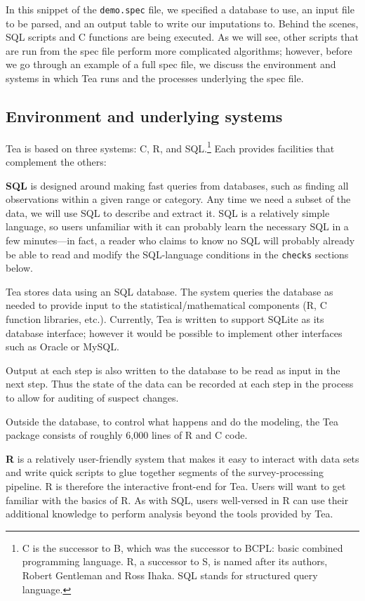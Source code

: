 \documentclass{article}
\begin{document}
In this snippet of the {\tt demo.spec} file, we specified a database to use, an input
file to be parsed, and an output table to write our imputations to. Behind the scenes,
SQL scripts and C functions are being executed. As we will see, other scripts that
are run from the spec file perform more complicated algorithms; however, before we
go through an example of a full spec file, we discuss the environment and systems in
which Tea runs and the processes underlying the spec file.

\subsection{Environment and underlying systems}
Tea is based on three systems: C, R, and SQL.\footnote{C is the successor to B, which
was the successor to BCPL: basic combined programming language. R, a successor to S,
is named after its authors, Robert Gentleman and Ross Ihaka. SQL stands for structured
query language.} Each provides facilities that complement the others:

{\bf SQL} is designed around making fast queries from databases, such as finding all
observations within a given range or category. Any time we need a subset of the data,
we will use SQL to describe and extract it. SQL is a relatively simple language, so
users unfamiliar with it can probably learn the necessary SQL in a few minutes---in
fact, a reader who claims to know no SQL will probably already be able to read and
modify the SQL-language conditions in the {\tt checks} sections below.

Tea stores data using an SQL database. The system queries the database as needed to
provide input to the statistical/mathematical components (R, C function libraries,
etc.).  Currently, Tea is written to support SQLite as its database interface; however
it would be possible to implement other interfaces such as Oracle or MySQL.

Output at each step is also written to the database to be read as input in the next
step. Thus the state of the data can be recorded at each step in the process to allow
for auditing of suspect changes.

Outside the database, to control what happens and do the modeling, the Tea package
consists of roughly 6,000 lines of R and C code.

{\bf R} is a relatively user-friendly system that makes it easy to interact with data
sets and write quick scripts to glue together segments of the survey-processing pipeline.
R is therefore the interactive front-end for Tea. Users will want to get familiar with
the basics of R.  As with SQL, users well-versed in R can use their additional
knowledge to perform analysis beyond the tools provided by Tea.
\end{document}
